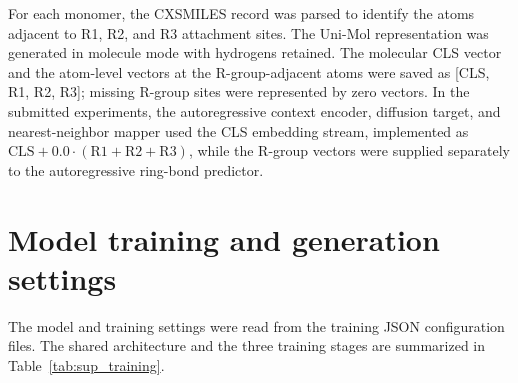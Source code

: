 \documentclass[12pt]{article}
\begin{document}
For each monomer, the CXSMILES record was parsed to identify the atoms adjacent to R1, R2, and R3 attachment sites.
The Uni-Mol representation was generated in molecule mode with hydrogens retained.
The molecular CLS vector and the atom-level vectors at the R-group-adjacent atoms were saved as [CLS, R1, R2, R3]; missing R-group sites were represented by zero vectors.
In the submitted experiments, the autoregressive context encoder, diffusion target, and nearest-neighbor mapper used the CLS embedding stream, implemented as \(\mathrm{CLS}+0.0\cdot(\mathrm{R1}+\mathrm{R2}+\mathrm{R3})\), while the R-group vectors were supplied separately to the autoregressive ring-bond predictor.

\section{Model training and generation settings}
\label{supsec:training_generation_settings}

The model and training settings were read from the training JSON configuration files.
The shared architecture and the three training stages are summarized in Table~\ref{tab:sup_training}.
\end{document}
